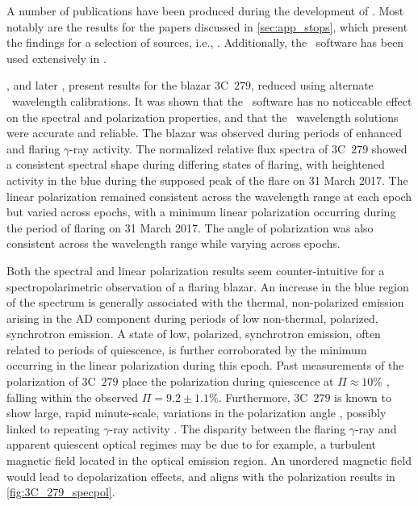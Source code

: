 A number of publications have been produced during the development of \stops.
Most notably are the results for the papers discussed in \autoref{sec:app_stops}, which present the findings for a selection of sources, i.e., \citet{Buckley191221B, Cooper_HEASA2021, Cooper_HEASA2022, Schutte4C0102}.
Additionally, the \stops\ software has been used extensively in \citet{Barnard_HEASA2021, Barnard_2024, Barnard_thesis}.


\citet{Cooper_HEASA2021}, and later \citet{Cooper_HEASA2022}, present results for the blazar $3$C~$279$, reduced using alternate \iraf\ wavelength calibrations.
It was shown that the \stops\ software has no noticeable effect on the spectral and polarization properties, and that the \iraf\ wavelength solutions were accurate and reliable.
The blazar was observed during periods of enhanced and flaring $\gamma$-ray activity.
The normalized relative flux spectra of $3$C~$279$ showed a consistent spectral shape during differing states of flaring, with heightened activity in the blue during the supposed peak of the flare on 31 March 2017.
The linear polarization remained consistent across the wavelength range at each epoch but varied across epochs, with a minimum linear polarization occurring during the period of flaring on 31 March 2017.
The angle of polarization was also consistent across the wavelength range while varying across epochs.

Both the spectral and linear polarization results seem counter-intuitive for a spectropolarimetric observation of a flaring blazar.
An increase in the blue region of the spectrum is generally associated with the thermal, non-polarized emission arising in the \gls{AD} component during periods of low non-thermal, polarized, synchrotron emission.
A state of low, polarized, synchrotron emission, often related to periods of quiescence, is further corroborated by the minimum occurring in the linear polarization during this epoch.
Past measurements of the polarization of 3C~$279$ place the polarization during quiescence at $\Pi \approx 10 \%$ \citep[see e.g., ][]{3C279_xray}, falling within the observed $\Pi = 9.2 \pm 1.1\%$.
Furthermore, 3C~$279$ is known to show large, rapid minute-scale, variations in the polarization angle \citep{3C279_var}, possibly linked to repeating $\gamma$-ray activity \citep{3C279_repeat}.
The disparity between the flaring $\gamma$-ray and apparent quiescent optical regimes may be due to for example, a turbulent magnetic field located in the optical emission region.
An unordered magnetic field would lead to depolarization effects, and aligns with the polarization results in \autoref{fig:3C_279_specpol}.

